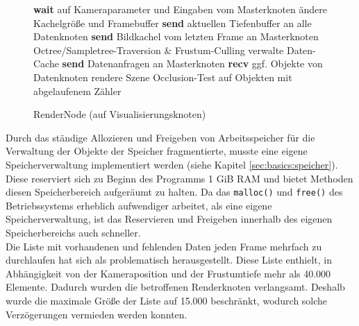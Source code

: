 \begin{figure}[ttt!]
\centering
 \begin{minipage}[t]{12cm}
\begin{algorithm}[H]
  \caption{RenderNode (auf Visualisierungsknoten)\label{alg:impl:rendernode}} 
    \begin{algorithmic} [1]
      \LOOP
	\STATE \textbf{wait} auf Kameraparameter und Eingaben vom Masterknoten
	  \STATE ändere Kachelgröße und Framebuffer
	  \STATE \textbf{send} aktuellen Tiefenbuffer an alle Datenknoten
	\ENDIF
	\STATE \textbf{send} Bildkachel vom letzten Frame an Masterknoten
	\STATE Octree/Sampletree-Traversion \& Frustum-Culling
	\STATE verwalte Daten-Cache
	\STATE \textbf{send} Datenanfragen an Masterknoten
	\STATE \textbf{recv} ggf. Objekte von Datenknoten
	\STATE rendere Szene
	\STATE Occlusion-Test auf Objekten mit abgelaufenem Zähler
      \ENDLOOP
    \end{algorithmic}
\end{algorithm}
 \end{minipage}
\end{figure}
Durch das ständige Allozieren und Freigeben von Arbeitsspeicher für die Verwaltung der Objekte der Speicher fragmentierte, musste eine eigene Speicherverwaltung implementiert werden (siehe Kapitel \ref{sec:basics:speicher}). Diese reserviert sich zu Beginn des Programms 1 GiB RAM und bietet Methoden diesen Speicherbereich aufgeräumt zu halten. Da das \verb|malloc()| und \verb|free()| des Betriebssystems erheblich aufwendiger arbeitet, als eine eigene Speicherverwaltung, ist das Reservieren und Freigeben innerhalb des eigenen Speicherbereichs auch schneller.\\
Die Liste mit vorhandenen und fehlenden Daten jeden Frame mehrfach zu durchlaufen hat sich als problematisch herausgestellt. Diese Liste enthielt, in Abhängigkeit von der Kameraposition und der Frustumtiefe mehr als 40.000 Elemente. Dadurch wurden die betroffenen Renderknoten verlangsamt. Deshalb wurde die maximale Größe der Liste auf 15.000 beschränkt, wodurch solche Verzögerungen vermieden werden konnten.

